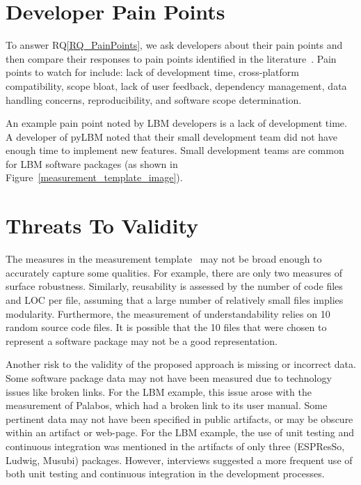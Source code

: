 \documentclass[runningheads]{llncs}
\newcommand{\rqref}[1]{RQ\ref{#1}}
\begin{document}
\section{Developer Pain Points} \label{painpoints}

To answer \rqref{RQ_PainPoints}, we ask developers about their pain points and
then compare their responses to pain points identified in the
literature~\cite{WieseEtAl2019,PintoEtAl2018}.  Pain points to watch for
include: lack of development time, cross-platform compatibility, scope bloat,
lack of user feedback, dependency management, data handling concerns,
reproducibility, and software scope determination. 

An example pain point noted by LBM developers is a lack of development time. A
developer of pyLBM noted that their small development team did not have enough
time to implement new features. Small development teams are common for LBM
software packages (as shown in Figure~\ref{measurement_template_image}).

\section{Threats To Validity} \label{threats}

The measures in the measurement template~\cite{SmithEtAl2021} may not be broad
enough to accurately capture some qualities. For example, there are only two
measures of surface robustness. Similarly, reusability is assessed by the number
of code files and LOC per file, assuming that a large number of relatively small
files implies modularity. Furthermore, the measurement of understandability
relies on 10 random source code files. It is possible that the 10 files that
were chosen to represent a software package may not be a good representation.

Another risk to the validity of the proposed approach is missing or incorrect
data. Some software package data may not have been measured due to technology
issues like broken links. For the LBM example, this issue arose with the
measurement of Palabos, which had a broken link to its user manual. Some
pertinent data may not have been specified in public artifacts, or may be
obscure within an artifact or web-page. For the LBM example, the use of unit
testing and continuous integration was mentioned in the artifacts of only three
(ESPResSo, Ludwig, Musubi) packages. However, interviews suggested a more
frequent use of both unit testing and continuous integration in the development
processes.
\end{document}
